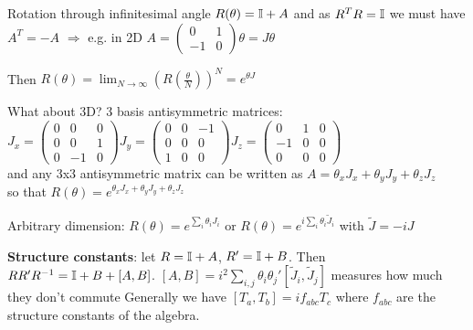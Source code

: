 \begin{squishlist}
\item Rotation through infinitesimal angle $R(\theta) = \mathbb{I} + A$ and as $R^T R = \mathbb{I}$ we must have $A^T = -A$ $\Longrightarrow $ e.g. in 2D $A = \begin{pmatrix} 0 & 1 \\ -1 & 0 \end{pmatrix}\theta = J \theta$
\item Then $R(\theta) = \lim_{N\rightarrow \infty} \left( R(\frac{\theta}{N})\right)^N = e^{\theta J}$
\item What about 3D? 3 basis antisymmetric matrices: \\
$J_x = \begin{pmatrix} 0 & 0 & 0 \\ 0 & 0 & 1 \\ 0 & -1 & 0 \end{pmatrix}
J_y = \begin{pmatrix} 0 & 0 & -1 \\ 0 & 0 & 0 \\ 1 & 0 & 0 \end{pmatrix}
J_z = \begin{pmatrix} 0 & 1 & 0 \\ -1 & 0 & 0 \\ 0 & 0 & 0 \end{pmatrix}$ \\
    and any 3x3 antisymmetric matrix can be written as $A = \theta_x J_x + \theta_y J_y + \theta_z J_z$ \\
    so that $R(\theta) = e^{\theta_x J_x + \theta_y J_y + \theta_z J_z}$

\item Arbitrary dimension: $R(\theta) = e^{\sum_i \theta_i J_i}$ or $R(\theta) = e^{i\sum_i \theta_i \tilde{J}_i}$ with $\tilde{J} = -iJ$
\item \textbf{Structure constants}: let $R = \mathbb{I} +A$, $R' = \mathbb{I} +B$. Then $R R' R^{-1} = \mathbb{I} + B + [A, B]$. $[A,B] = i^2 \sum_{i,j} \theta_i \theta_j' [\tilde{J}_i, \tilde{J}_j]$ measures how much they don't commute
Generally we have $[T_a, T_b] = i f_{abc} T_c$ where $f_{abc}$ are the structure constants of the algebra.


\end{squishlist}
